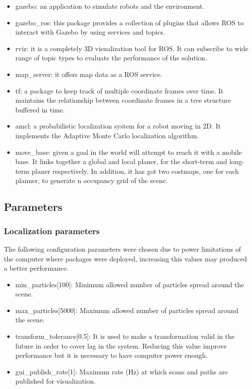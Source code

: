 \documentclass[10pt,journal,compsoc]{IEEEtran}
\begin{document}
\begin{itemize}
\item gazebo: an application to simulate robots and the environment.
\item gazebo\_ros: this package provides a collection of plugins that allows ROS to interact with Gazebo by using services and topics.
\item rviz: it is a completely 3D visualization tool for ROS. It can subscribe to wide range of topic types to evaluate the performance of the solution.
\item map\_server: it offers map data as a ROS service.
\item tf: a package to keep track of multiple coordinate frames over time. It maintains the relationship between coordinate frames in a tree structure buffered in time.
\item amcl: a probabilistic localization system for a robot moving in 2D. It implements the Adaptive Monte Carlo localization algorithm.
\item move\_base: given a goal in the world will attempt to reach it with a mobile base. It links together a global and local planer, for the short-term and long-term planer respectively. In addition, it has got two costmaps, one for each planner, to generate n occupancy grid of the scene.
\end{itemize}

\subsection{Parameters}

\subsubsection{Localization parameters}

The following configuration parameters were chosen due to power limitations of the computer where packages were deployed, increasing this values may produced a better performance.

\begin{itemize}
\item min\_particles[100]: Minimum allowed number of particles spread around the scene.
\item max\_particles[5000]: Maximum allowed number of particles spread around the scene. 
\item transform\_tolerance[0.5]: It is used to make a transformation valid in the future in order to cover lag in the system. Reducing this value improve performance but it is necessary to have computer power enough.
\item gui\_publish\_rate[1]: Maximum rate (Hz) at which scans and paths are published for visualization.
\end{itemize}
\end{document}
